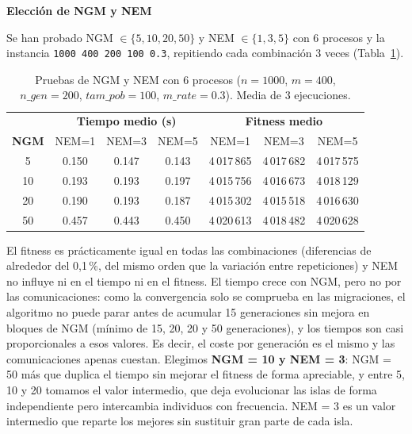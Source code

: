 \documentclass[12pt]{article}
\begin{document}
\begin{enumerate}
\vspace{0.5cm}

\medskip
\noindent\textbf{Elección de NGM y NEM}\par
\smallskip

Se han probado NGM $\in \{5, 10, 20, 50\}$ y NEM $\in \{1, 3, 5\}$ con 6 procesos y la instancia \texttt{1000 400 200 100 0.3}, repitiendo cada combinación 3 veces (Tabla~\ref{tab:ngm_nem}).

\begin{table}[htbp]
\centering
\begin{tabular}{c|ccc|ccc}
\toprule
& \multicolumn{3}{c|}{\textbf{Tiempo medio (s)}} & \multicolumn{3}{c}{\textbf{Fitness medio}} \\
\textbf{NGM} & NEM=1 & NEM=3 & NEM=5 & NEM=1 & NEM=3 & NEM=5 \\
\midrule
5  & 0.150 & 0.147 & 0.143 & 4\,017\,865 & 4\,017\,682 & 4\,017\,575 \\
10 & 0.193 & 0.193 & 0.197 & 4\,015\,756 & 4\,016\,673 & 4\,018\,129 \\
20 & 0.190 & 0.193 & 0.187 & 4\,015\,302 & 4\,015\,518 & 4\,016\,630 \\
50 & 0.457 & 0.443 & 0.450 & 4\,020\,613 & 4\,018\,482 & 4\,020\,628 \\
\bottomrule
\end{tabular}
\caption{Pruebas de NGM y NEM con 6 procesos ($n=1000$, $m=400$, $n\_gen=200$, $tam\_pob=100$, $m\_rate=0.3$). Media de 3 ejecuciones.}
\label{tab:ngm_nem}
\end{table}

El fitness es prácticamente igual en todas las combinaciones (diferencias de alrededor del 0{,}1\,\%, del mismo orden que la variación entre repeticiones) y NEM no influye ni en el tiempo ni en el fitness. El tiempo crece con NGM, pero no por las comunicaciones: como la convergencia solo se comprueba en las migraciones, el algoritmo no puede parar antes de acumular 15 generaciones sin mejora en bloques de NGM (mínimo de 15, 20, 20 y 50 generaciones), y los tiempos son casi proporcionales a esos valores. Es decir, el coste por generación es el mismo y las comunicaciones apenas cuestan. Elegimos \textbf{NGM = 10 y NEM = 3}: NGM = 50 más que duplica el tiempo sin mejorar el fitness de forma apreciable, y entre 5, 10 y 20 tomamos el valor intermedio, que deja evolucionar las islas de forma independiente pero intercambia individuos con frecuencia. NEM = 3 es un valor intermedio que reparte los mejores sin sustituir gran parte de cada isla.


\end{enumerate}
\end{document}
